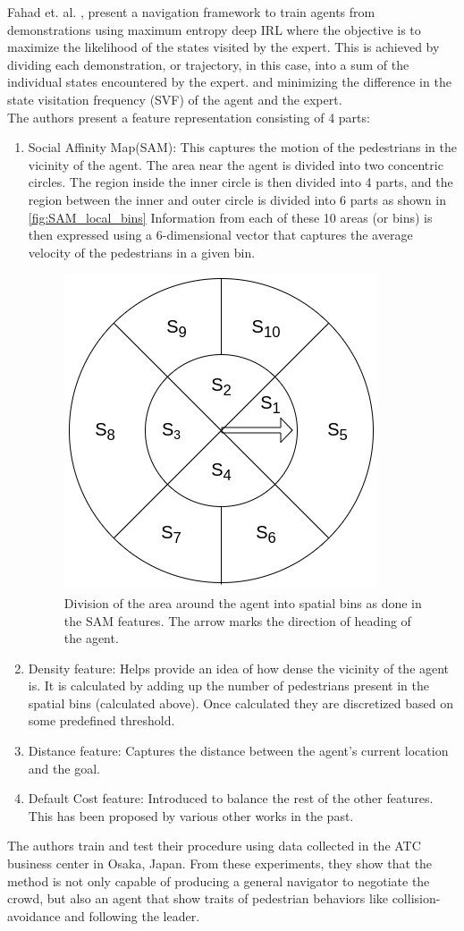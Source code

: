 Fahad et. al. \cite{fahad_learning_2018}, present a navigation framework to train agents from demonstrations using maximum entropy deep IRL where the objective is to maximize the likelihood of the states visited by the expert.
This is achieved by dividing each demonstration, or trajectory, in this case, into a sum of the individual states encountered by the expert. and minimizing the difference in the state visitation frequency (SVF) of the agent and the expert.\\
The authors present a feature representation consisting of 4 parts:
\begin{enumerate}
    \item Social Affinity Map(SAM): This captures the motion of the pedestrians in the vicinity of the agent. The area near the agent is divided into two concentric circles. The region inside the inner circle is then divided into 4 parts, and the region between the inner and outer circle is divided into 6 parts as shown in \autoref{fig:SAM_local_bins}
    Information from each of these 10 areas (or bins) is then expressed using a 6-dimensional vector that captures the average velocity of the pedestrians in a given bin. 
    \begin{figure}
    	\centering
    	\includegraphics[width=0.5\linewidth]{figures/SAM_local_bins.png}
    	\caption{Division of the area around the agent into spatial bins as done in the SAM features. The arrow marks the direction of heading of the agent.}
    	\label{fig:SAM_local_bins}
    \end{figure}
    \item Density feature: Helps provide an idea of how dense the vicinity of the agent is. It is calculated by adding up the number of pedestrians present in the spatial bins (calculated above). Once calculated they are discretized based on some predefined threshold.
    \item Distance feature: Captures the distance between the agent's current location and the goal.
    \item Default Cost feature: Introduced to balance the rest of the other features. This has been proposed by various other works in the past.
    
\end{enumerate}
The authors train and test their procedure using data collected in the ATC business center in Osaka, Japan.
From these experiments, they show that the method is not only capable of producing a general navigator to negotiate the crowd, but also an agent that show traits of pedestrian behaviors like collision-avoidance and following the leader.


